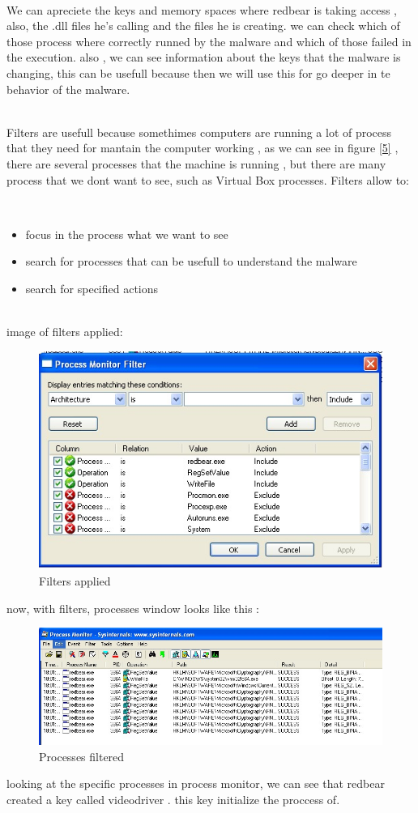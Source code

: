 \documentclass[10pt,a4paper]{article} %
\begin{document}
        \\
        We can apreciete the keys and memory spaces where redbear is taking
        access , also, the .dll files he's calling and the files he is
        creating. we can check which of those process where correctly runned by
        the malware and which of those failed in the execution. also , we can
        see information about the keys that the malware is changing, this can
        be usefull because then we will use this for go deeper in te behavior
        of the malware.

        \\
        Filters are usefull because somethimes computers are running a lot of
        process that they need for mantain the computer working , as we can see
        in figure \ref{5} , there are several processes that the machine is
        running , but there are many process that we dont want to see, such as
        Virtual Box processes. Filters allow to:

        \\
        \begin{itemize}
            \item {focus in the process what we want to see}
            \item {search for processes that can be usefull to understand the malware}
            \item {search for specified actions}
        \end{itemize}

        \\ image of filters applied:
        \begin{figure}[h]
            \centering
            \includegraphics[width=0.4\linewidth]{fig6.jpeg}
            \caption{Filters applied}
            \label{6}
        \end{figure}
        \newpage
        now, with filters, processes window looks like this :
        \\
        \begin{figure}[h!]
            \centering
            \includegraphics[width=0.4\linewidth]{fig7.jpeg}
            \caption{Processes filtered}
            \label{7}
        \end{figure}
        looking at the specific processes in process monitor, we can see that
        redbear created a key called videodriver . this key initialize the proccess of.
\end{document}
